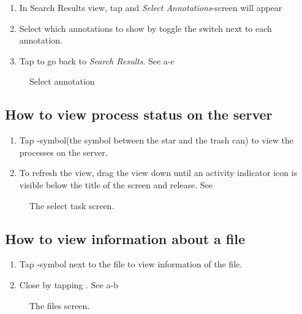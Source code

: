 \begin{enumerate}
\item In Search Results view, tap  and \emph{Select Annotations}-screen will appear
\item Select which annotations to show by toggle the switch next to each annotation.
\item Tap  to go back to \emph{Search Results}. See a-c
\end{enumerate}

\begin{figure}[ht]
\caption{Select annotation}
\label{fig:ios_searchResult}
\end{figure}
\FloatBarrier

\subsection{How to view process status on the server}

\begin{enumerate}
\item Tap -symbol(the symbol between the star and the trash can) to view the processes on the server.
\item To refresh the view, drag the view down until an activity indicator icon is visible below the title of the screen and release. See 
\end{enumerate}

\begin{figure}[htb]
\caption{The select task screen.}
\label{fig:ios_processes}
\end{figure}
\FloatBarrier

\subsection{How to view information about a file}

\begin{enumerate}
\item Tap -symbol next to the file to view information of the file.
\item Close by tapping . See a-b
\end{enumerate}

\begin{figure}[htb]
\caption{The files screen.}
\label{fig:ios_files1}
\end{figure}
\FloatBarrier


